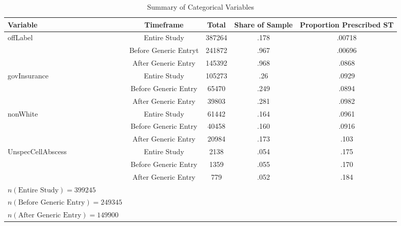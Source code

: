 \begin{table}[htbp]\centering
\def\sym#1{\ifmmode^{#1}\else\(^{#1}\)\fi}
\caption{Summary of Categorical Variables\label{tab1}}
\begin{tabular}{l*{4}{c}}
\hline\hline
            Variable&\multicolumn{1}{c}{Timeframe}&\multicolumn{1}{c}{Total}&\multicolumn{1}{c}{Share of Sample}&\multicolumn{1}{c}{Proportion Prescribed ST}\\
\hline
offLabel                  &     Entire Study&             387264&      .178&     .00718\\
                          &     Before Generic Entryt&    241872&      .967&     .00696\\
                          &     After Generic Entry&      145392&      .968&     .0868\\
[1em]
govInsurance              &     Entire Study&             105273&      .26 &     .0929\\
                          &     Before Generic Entry&     65470 &      .249&     .0894\\
                          &     After Generic Entry&      39803 &      .281&     .0982\\
[1em]
nonWhite                  &     Entire Study&             61442&      .164&     .0961\\
                          &     Before Generic Entry&     40458&      .160&     .0916\\
                          &     After Generic Entry&      20984&      .173&     .103\\
[1em]
UnspecCellAbscess         &     Entire Study&             2138 &      .054&     .175\\
                          &     Before Generic Entry&     1359 &      .055&     .170\\
                          &     After Generic Entry&      779  &      .052&     .184\\
\hline
$n(\text{Entire Study}) = 399245$\\
$n(\text{Before Generic Entry}) = 249345$\\
$n(\text{After Generic Entry}) = 149900$\\
\hline\hline
\end{tabular}
\label{tab:Table4.3}
\end{table}

